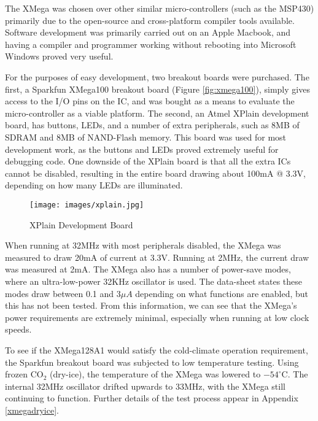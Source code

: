 \documentclass[a4paper,12pt]{article}
\begin{document}
The XMega was chosen over other similar micro-controllers (such as the MSP430) primarily due to the open-source and cross-platform compiler tools available. Software development was primarily carried out on an Apple Macbook, and having a compiler and programmer working without rebooting into Microsoft Windows proved very useful.

For the purposes of easy development, two breakout boards were purchased. The first, a Sparkfun XMega100 breakout board (Figure \ref{fig:xmega100}), simply gives access to the I/O pins on the IC, and was bought as a means to evaluate the micro-controller as a viable platform. The second, an Atmel XPlain development board, has buttons, LEDs, and a number of extra peripherals, such as 8MB of SDRAM and 8MB of NAND-Flash memory. This board was used for most development work, as the buttons and LEDs proved extremely useful for debugging code. One downside of the XPlain board is that all the extra ICs cannot be disabled, resulting in the entire board drawing about 100mA @ 3.3V, depending on how many LEDs are illuminated.

\begin{wrapfigure}{l}{0.4\textwidth}
  \begin{center}
    \texttt{[image: images/xplain.jpg]}
  \end{center}
  \caption{XPlain Development Board}
  \label{fig:xplain}
\end{wrapfigure}

When running at 32MHz with most peripherals disabled, the XMega was measured to draw 20mA of current at 3.3V. Running at 2MHz, the current draw was measured at 2mA. The XMega also has a number of power-save modes, where an ultra-low-power 32KHz oscillator is used. The data-sheet states these modes draw between 0.1 and $3\mu A$ depending on what functions are enabled, but this has not been tested. From this information, we can see that the XMega's power requirements are extremely minimal, especially when running at low clock speeds.

To see if the XMega128A1 would satisfy the cold-climate operation requirement, the Sparkfun breakout board was subjected to low temperature testing. Using frozen CO$_2$ (dry-ice), the temperature of the XMega was lowered to $-54^\circ$C. The internal 32MHz oscillator drifted upwards to 33MHz, with the XMega still continuing to function. Further details of the test process appear in  Appendix \ref{xmegadryice}.
\end{document}
